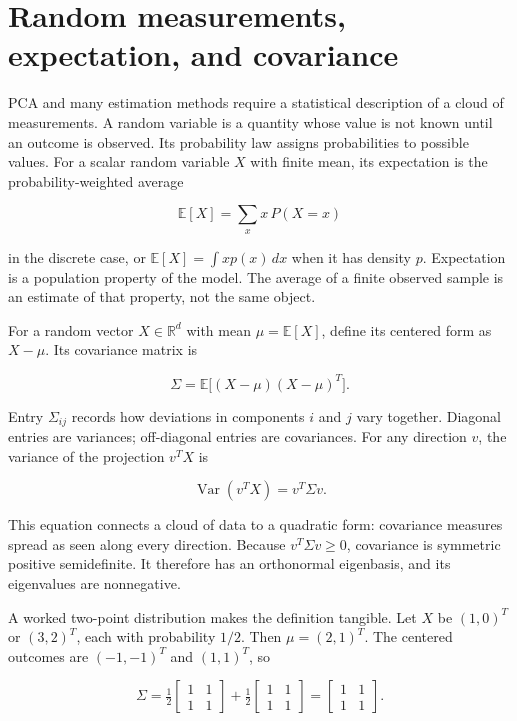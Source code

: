 \hypertarget{02-foundations-ii-ch022-from-uncertainty-to-trustworthy-samples-probability-and-monte-carlo}{}

\section{Random measurements, expectation, and covariance}\label{02-foundations-ii-ch022-random-measurements-expectation-and-covariance}

\hypertarget{02-foundations-ii-ch022-random-measurements-expectation-and-covariance}{}

PCA and many estimation methods require a statistical description of a cloud of measurements. A random variable is a quantity whose value is not known until an outcome is observed. Its probability law assigns probabilities to possible values. For a scalar random variable \(X\) with finite mean, its expectation is the probability-weighted average

\[
\mathbb E[X]=\sum_x x\,P(X=x)
\]

in the discrete case, or \(\mathbb E[X]=\int x p(x)\,dx\) when it has density \(p\). Expectation is a population property of the model. The average of a finite observed sample is an estimate of that property, not the same object.

For a random vector \(X\in\mathbb R^d\) with mean \(\mu=\mathbb E[X]\), define its centered form as \(X-\mu\). Its covariance matrix is

\[
\Sigma=\mathbb E\big[(X-\mu)(X-\mu)^T\big].
\]

Entry \(\Sigma_{ij}\) records how deviations in components \(i\) and \(j\) vary together. Diagonal entries are variances; off-diagonal entries are covariances. For any direction \(v\), the variance of the projection \(v^TX\) is

\[
\operatorname{Var}(v^TX)=v^T\Sigma v.
\]

This equation connects a cloud of data to a quadratic form: covariance measures spread as seen along every direction. Because \(v^T\Sigma v\ge 0\), covariance is symmetric positive semidefinite. It therefore has an orthonormal eigenbasis, and its eigenvalues are nonnegative.

A worked two-point distribution makes the definition tangible. Let \(X\) be \((1,0)^T\) or \((3,2)^T\), each with probability \(1/2\). Then \(\mu=(2,1)^T\). The centered outcomes are \((-1,-1)^T\) and \((1,1)^T\), so

\[
\Sigma=\tfrac12\begin{bmatrix}1&1\\1&1\end{bmatrix}
+\tfrac12\begin{bmatrix}1&1\\1&1\end{bmatrix}
=\begin{bmatrix}1&1\\1&1\end{bmatrix}.
\]


